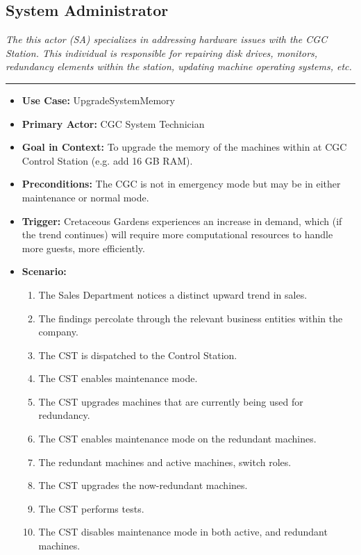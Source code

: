 \documentclass[12pt]{article}
\begin{document}
    \subsection{System Administrator}
    \textit{The this actor (SA) specializes in addressing hardware issues with the CGC Station. This
    individual is responsible for repairing disk drives, monitors, redundancy elements within the
    station, updating machine operating systems, etc.}
    \par\noindent\rule{\textwidth}{0.4pt}    
    \begin{itemize}
        \item[]\textbf{Use Case:}                                
            UpgradeSystemMemory

        \item[]\textbf{Primary Actor:}
            CGC System Technician

        \item[]\textbf{Goal in Context:}
            To upgrade the memory of the machines within at CGC Control Station (e.g. add 16 GB RAM).

        \item[]\textbf{Preconditions:}
            The CGC is not in emergency mode but may be in either maintenance or normal mode.

        \item[]\textbf{Trigger:}
            Cretaceous Gardens experiences an increase in demand, which (if the trend continues) will
            require more computational resources to handle more guests, more efficiently.

        \item[]\textbf{Scenario:}
            \begin{enumerate}
                \item The Sales Department notices a distinct upward trend in sales.
                \item The findings percolate through the relevant business entities within the company.
                \item The CST is dispatched to the Control Station.
                \item The CST enables maintenance mode.
                \item The CST upgrades machines that are currently being used for redundancy.
                \item The CST enables maintenance mode on the redundant machines.
                \item The redundant machines and active machines, switch roles.
                \item The CST upgrades the now-redundant machines.
                \item The CST performs tests.
                \item The CST disables maintenance mode in both active, and redundant machines.
            \end{enumerate}


\end{itemize}
\end{document}

